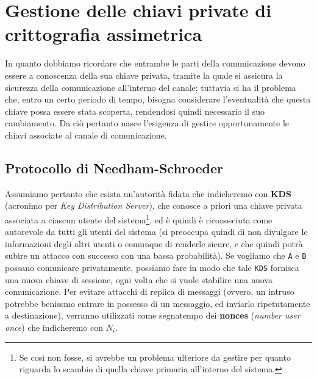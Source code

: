
\section{Gestione delle chiavi private di crittografia assimetrica}
In quanto dobbiamo ricordare che entrambe le parti della comunicazione devono
essere a conoscenza della sua chiave privata, tramite la quale si assicura la
sicurezza della comunicazione all'interno del canale; tuttavia si ha il 
problema che, entro un certo periodo di tempo, bisogna considerare l'eventualità
che questa chiave possa essere stata scoperta, rendendosi quindi necessario
il suo cambiamento. Da ciò pertanto nasce l'esigenza di gestire opportunamente
le chiavi associate al canale di comunicazione.

\subsection{Protocollo di Needham-Schroeder}
Assumiamo pertanto che esista un'autorità fidata che indicheremo con \textbf{KDS} 
(acronimo per \textit{Key Distribution Server}), che conosce a priori una chiave
privata associata a ciascun utente del sistema\footnote{Se così non fosse,
si avrebbe un problema ulteriore da gestire per quanto riguarda lo scambio di
quella chiave primaria all'interno del sistema.}, 
ed è quindi è riconosciuta
come autorevole da tutti gli utenti del sistema (si preoccupa quindi di non
divulgare le informazioni degli altri utenti o comunque di renderle sicure, e che
quindi potrà subire un attacco con successo con una bassa probabilità).
Se vogliamo che \texttt A e \texttt B possano comunicare privatamente, possiamo fare in
modo che tale \texttt{KDS} fornisca una nuova chiave di sessione, ogni volta che
si vuole stabilire una nuova comunicazione. 
Per evitare attacchi di replica di messaggi (ovvero, un intruso potrebbe
benissmo entrare in possesso di un messaggio, ed inviarlo ripetutamente a 
destinazione), verranno utilizzati come segnatempo dei \textbf{nonces} (\textit{number
user once}) che indicheremo con $N_i$. 
